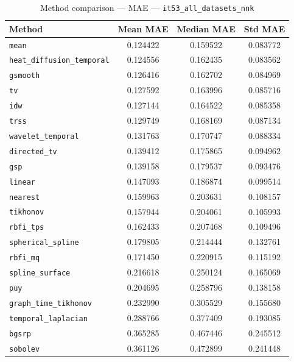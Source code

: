 \begin{table}[ht]
\centering
\caption{Method comparison — MAE — \texttt{it53_all_datasets_nnk}}
\label{tab:mae_it53_all_datasets_nnk}
\begin{tabular}{lccc}
\hline
Method & Mean MAE & Median MAE & Std MAE \\
\hline
\texttt{mean} & 0.124422 & 0.159522 & 0.083772 \\
\texttt{heat_diffusion_temporal} & 0.124556 & 0.162435 & 0.083562 \\
\texttt{gsmooth} & 0.126416 & 0.162702 & 0.084969 \\
\texttt{tv} & 0.127592 & 0.163996 & 0.085716 \\
\texttt{idw} & 0.127144 & 0.164522 & 0.085358 \\
\texttt{trss} & 0.129749 & 0.168169 & 0.087134 \\
\texttt{wavelet_temporal} & 0.131763 & 0.170747 & 0.088334 \\
\texttt{directed_tv} & 0.139412 & 0.175865 & 0.094962 \\
\texttt{gsp} & 0.139158 & 0.179537 & 0.093476 \\
\texttt{linear} & 0.147093 & 0.186874 & 0.099514 \\
\texttt{nearest} & 0.159963 & 0.203631 & 0.108157 \\
\texttt{tikhonov} & 0.157944 & 0.204061 & 0.105993 \\
\texttt{rbfi_tps} & 0.162433 & 0.207468 & 0.109496 \\
\texttt{spherical_spline} & 0.179805 & 0.214444 & 0.132761 \\
\texttt{rbfi_mq} & 0.171450 & 0.220915 & 0.115192 \\
\texttt{spline_surface} & 0.216618 & 0.250124 & 0.165069 \\
\texttt{puy} & 0.204695 & 0.258796 & 0.138158 \\
\texttt{graph_time_tikhonov} & 0.232990 & 0.305529 & 0.155680 \\
\texttt{temporal_laplacian} & 0.288766 & 0.377409 & 0.193085 \\
\texttt{bgsrp} & 0.365285 & 0.467446 & 0.245512 \\
\texttt{sobolev} & 0.361126 & 0.472899 & 0.241448 \\
\hline
\end{tabular}
\end{table}
